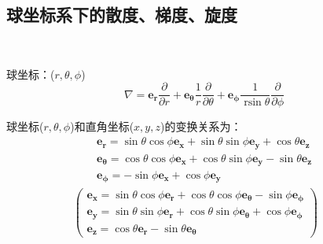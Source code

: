 \documentclass[UTF8]{ctexart}
\newcommand{\tmmathbf}[1]{\ensuremath{\boldsymbol{#1}}}
\newcommand{\tmop}[1]{\ensuremath{\operatorname{#1}}}
\begin{document}
\subsection{球坐标系下的散度、梯度、旋度}

\

球坐标：($r, \theta, \phi$)
\begin{equation}
  \nabla = \tmmathbf{e_r} \frac{\partial}{\partial r} + \tmmathbf{e_{\theta}}
  \frac{1}{r} \frac{\partial}{\partial \theta} + \tmmathbf{e_{\phi}}
  \frac{1}{\tmop{rsin} \theta} \frac{\partial}{\partial \phi}
\end{equation}


球坐标($r, \theta, \phi$)和直角坐标($x, y, z$)的变换关系为：
\[ \begin{array}{c}
     \tmmathbf{e_r} = \sin \theta \cos \phi \tmmathbf{e_x} + \sin \theta \sin
     \phi \tmmathbf{e_y} + \cos \theta \tmmathbf{e_z}\\
     \tmmathbf{e_{\theta}} = \cos \theta \cos \phi \tmmathbf{e_x} + \cos
     \theta \sin \phi \tmmathbf{e_y} - \sin \theta \tmmathbf{e_z}\\
     \tmmathbf{e_{\phi}} = - \sin \phi \tmmathbf{e_x} + \cos \phi
     \tmmathbf{e_y}
   \end{array} \]
\begin{eqnarray*}
  \left(\begin{array}{c}
    \tmmathbf{e_x} = \sin \theta \cos \phi \tmmathbf{e_r} + \cos \theta \cos
    \phi \tmmathbf{e_{\theta}} - \sin \phi \tmmathbf{e_{\phi}}\\
    \tmmathbf{e_y} = \sin \theta \sin \phi \tmmathbf{e_r} + \cos \theta \sin
    \phi \tmmathbf{e_{\theta}} + \cos \phi \tmmathbf{e_{\phi}}\\
    \tmmathbf{e_z} = \cos \theta \tmmathbf{e_r} - \sin \theta
    \tmmathbf{e_{\theta}}
  \end{array}\right) &  & 
\end{eqnarray*}
\end{document}
